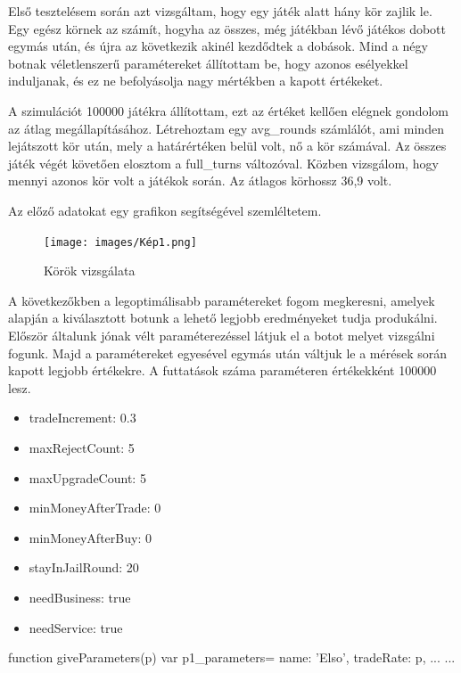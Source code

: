 
Első tesztelésem során azt vizsgáltam, hogy egy játék alatt hány kör zajlik le. Egy egész körnek az számít, hogyha az összes, még játékban lévő játékos dobott egymás után, és újra az következik akinél kezdődtek a dobások. Mind a négy botnak véletlenszerű paramétereket állítottam be, hogy azonos esélyekkel induljanak, és ez ne befolyásolja nagy mértékben a kapott értékeket.

A szimulációt 100000 játékra állítottam, ezt az értéket kellően elégnek gondolom az átlag megállapításához. Létrehoztam egy avg\_rounds számlálót, ami minden lejátszott kör után, mely a határértéken belül volt, nő a kör számával. Az összes játék végét követően elosztom a full\_turns változóval. Közben vizsgálom, hogy mennyi azonos kör volt a játékok során.  Az átlagos körhossz 36,9 volt.

Az előző adatokat egy grafikon segítségével szemléltetem.

\begin{figure}[h!]
\centering
\texttt{[image: images/Kép1.png]}
\caption{Körök vizsgálata}
\label{fig:ff}
\end{figure}


A következőkben a legoptimálisabb paramétereket fogom megkeresni, amelyek alapján a kiválasztott botunk a lehető legjobb eredményeket tudja produkálni. Először általunk jónak vélt paraméterezéssel látjuk el a botot melyet vizsgálni fogunk. Majd a paramétereket egyesével egymás után váltjuk le a mérések során kapott legjobb értékekre. A futtatások száma paraméteren értékekként 100000 lesz.

\begin{itemize}
	\item tradeIncrement: 0.3
	\item maxRejectCount: 5
	\item maxUpgradeCount: 5
	\item minMoneyAfterTrade: 0
	\item minMoneyAfterBuy: 0
	\item stayInJailRound: 20
	\item needBusiness: true
	\item needService: true
\end{itemize}

\begin{javascript}
function giveParameters(p){
        var p1_parameters={
            name: 'Elso',
            tradeRate: p,
		...
	   }
   ...
}
\end{javascript}

